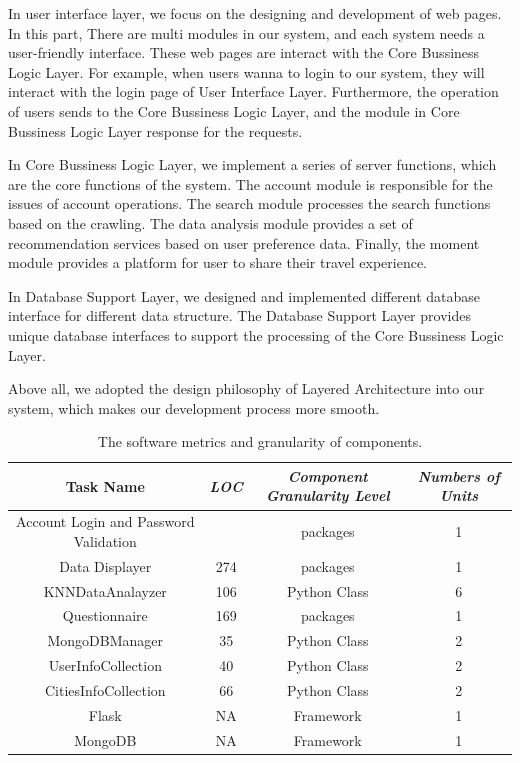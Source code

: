 \documentclass[conference]{IEEEtran}
\begin{document}
In user interface layer, we focus on the designing and development of web pages. In this part,  There are multi modules in our system, and each system needs a user-friendly interface. These web pages are interact with the Core Bussiness Logic Layer. For example, when users wanna to login to our system, they will interact with the login page of User Interface Layer. Furthermore, the operation of users sends to the Core Bussiness Logic Layer, and the module in Core Bussiness Logic Layer response for the requests.

In Core Bussiness Logic Layer, we implement a series of server functions, which are the core functions of the system. The account module is responsible for the issues of account operations. The search module processes the search functions based on the crawling. The data analysis module provides a set of recommendation services based on user preference data. Finally, the moment module provides a platform for user to share their travel experience.

In Database Support Layer, we designed and implemented different database interface for different data structure. The Database Support Layer provides unique database interfaces to support the processing of the Core Bussiness Logic Layer.

Above all, we adopted the design philosophy of Layered Architecture into our system, which makes our development process more smooth.



\begin{table}[htbp]
\caption{The software metrics and granularity of components.}
\begin{center}
\begin{tabular}{|c|c|c|c|}
\hline
\textbf{Task Name} & \textbf{\textit{LOC}}& \textbf{\textit{Component Granularity Level}}& \textbf{\textit{Numbers of Units}} \\
\hline
Account Login and Password Validation &  & packages & 1 \\
Data Displayer & 274  & packages & 1 \\
KNNDataAnalayzer & 106 & Python Class &  6 \\
Questionnaire & 169 & packages & 1 \\
MongoDBManager & 35 & Python Class & 2 \\
UserInfoCollection & 40 & Python Class & 2 \\
CitiesInfoCollection & 66 & Python Class & 2 \\


Flask & NA & Framework & 1 \\
MongoDB & NA & Framework & 1 \\

\hline
\end{tabular}
\label{tab1}
\end{center}
\end{table}
\end{document}

